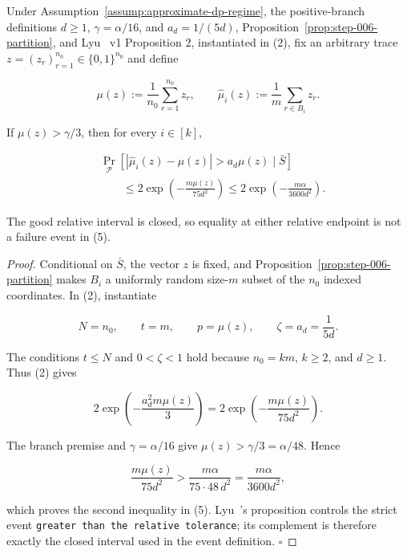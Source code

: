 \begin{lemma}\label{lem:step-006-high-tail}
Under Assumption~\ref{assump:approximate-dp-regime}, the positive-branch
definitions \(d\geq1\), \(\gamma=\alpha/16\), and \(a_d=1/(5d)\),
Proposition~\ref{prop:step-006-partition}, and Lyu~\citep{lyu2025} v1
  Proposition 2, instantiated in (2), fix an arbitrary trace
\(z=(z_r)_{r=1}^{n_0}\in\{0,1\}^{n_0}\) and define

\[
 \mu(z):=\frac1{n_0}\sum_{r=1}^{n_0}z_r,
 \qquad
 \widehat\mu_i(z):=\frac1m\sum_{r\in B_i}z_r.
\tag{4}
\]

If \(\mu(z)>\gamma/3\), then for every \(i\in[k]\),

\[
\begin{aligned}
 &\Pr_{\mathcal P}
 \left[|\widehat\mu_i(z)-\mu(z)|>a_d\mu(z)\mid\bar S\right]\\
 &\qquad\leq
 2\exp\!\left(-\frac{m\mu(z)}{75d^2}\right)
 \leq
 2\exp\!\left(-\frac{m\alpha}{3600d^2}\right).
\end{aligned}
\tag{5}
\]

The good relative interval is closed, so equality at either relative
endpoint is not a failure event in (5).


\end{lemma}

\begin{proof}
Conditional on \(\bar S\), the vector \(z\) is fixed, and
Proposition~\ref{prop:step-006-partition} makes \(B_i\) a uniformly random
size-\(m\) subset of the \(n_0\) indexed coordinates.  In (2), instantiate

\[
 N=n_0,\qquad t=m,\qquad p=\mu(z),\qquad \zeta=a_d=\frac1{5d}.
\]

The conditions \(t\leq N\) and \(0<\zeta<1\) hold because
\(n_0=km\), \(k\geq2\), and \(d\geq1\).  Thus (2) gives

\[
 2\exp\!\left(-\frac{a_d^2m\mu(z)}3\right)
 =2\exp\!\left(-\frac{m\mu(z)}{75d^2}\right).
\]

The branch premise and \(\gamma=\alpha/16\) give
\(\mu(z)>\gamma/3=\alpha/48\).  Hence

\[
 \frac{m\mu(z)}{75d^2}
 >\frac{m\alpha}{75\cdot48\,d^2}
 =\frac{m\alpha}{3600d^2},
\]

which proves the second inequality in (5).  Lyu~\citep{lyu2025}'s proposition controls the
strict event \texttt{greater than the relative tolerance}; its complement is
therefore exactly the closed interval used in the event definition.
\(\square\)


\end{proof}

